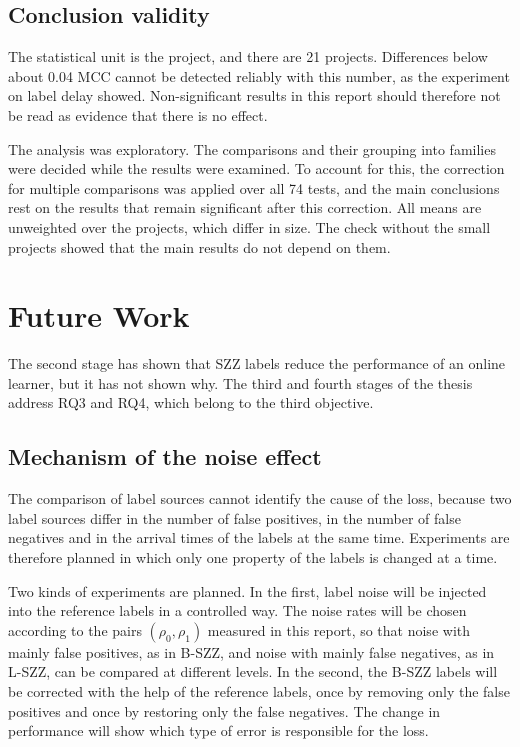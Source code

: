 \documentclass[12pt,a4paper,oneside]{report}
\newcommand{\rhoz}{\rho_0}
\newcommand{\rhoo}{\rho_1}
\begin{document}
\subsection{Conclusion validity}

The statistical unit is the project, and there are 21 projects. Differences
below about 0.04 MCC cannot be detected reliably with this number, as the
experiment on label delay showed. Non-significant results in this report
should therefore not be read as evidence that there is no effect.

The analysis was exploratory. The comparisons and their grouping into
families were decided while the results were examined. To account for this,
the correction for multiple comparisons was applied over all 74 tests, and
the main conclusions rest on the results that remain significant after this
correction. All means are unweighted over the projects, which differ in
size. The check without the small projects showed that the main results do
not depend on them.

\section{Future Work}\label{sec:future}

The second stage has shown that SZZ labels reduce the performance of an online
learner, but it has not shown why. The third and fourth stages of the thesis
address RQ3 and RQ4, which belong to the third objective.

\subsection{Mechanism of the noise effect}

The comparison of label sources cannot identify the cause of the loss,
because two label sources differ in the number of false positives, in the
number of false negatives and in the arrival times of the labels at the same
time. Experiments are therefore planned in which only one property of the
labels is changed at a time.

Two kinds of experiments are planned. In the first, label noise will be
injected into the reference labels in a controlled way. The noise rates will
be chosen according to the pairs $(\rhoz,\rhoo)$ measured in this report, so
that noise with mainly false positives, as in B-SZZ, and noise with mainly
false negatives, as in L-SZZ, can be compared at different levels. In the
second, the B-SZZ labels will be corrected with the help of the reference
labels, once by removing only the false positives and once by restoring only
the false negatives. The change in performance will show which type of error
is responsible for the loss.
\end{document}
